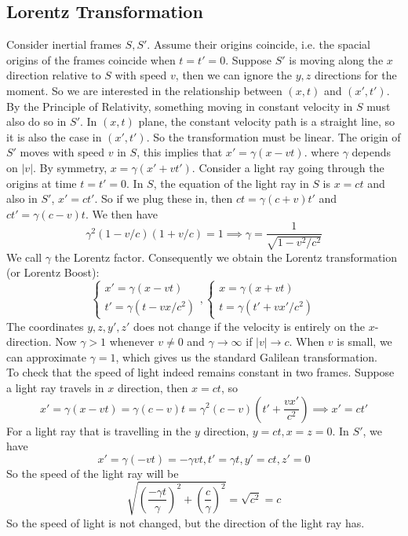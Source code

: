 \subsection{Lorentz Transformation}
Consider inertial frames $S,S'$.
Assume their origins coincide, i.e. the spacial origins of the frames coincide when $t=t'=0$.
Suppose $S'$ is moving along the $x$ direction relative to $S$ with speed $v$, then we can ignore the $y,z$ directions for the moment.
So we are interested in the relationship between $(x,t)$ and $(x',t')$.
By the Principle of Relativity, something moving in constant velocity in $S$ must also do so in $S'$.
In $(x,t)$ plane, the constant velocity path is a straight line, so it is also the case in $(x',t')$.
So the transformation must be linear.
The origin of $S'$ moves with speed $v$ in $S$, this implies that $x'=\gamma(x-vt)$.
where $\gamma$ depends on $|v|$.
By symmetry, $x=\gamma(x'+vt')$.
Consider a light ray going through the origins at time $t=t'=0$.
In $S$, the equation of the light ray in $S$ is $x=ct$ and also in $S'$, $x'=ct'$.
So if we plug these in, then $ct=\gamma(c+v)t'$ and $ct'=\gamma(c-v)t$.
We then have
$$\gamma^2(1-v/c)(1+v/c)=1\implies \gamma=\frac{1}{\sqrt{1-v^2/c^2}}$$
We call $\gamma$ the Lorentz factor.
Consequently we obtain the Lorentz transformation (or Lorentz Boost):
$$\begin{cases}
    x'=\gamma(x-vt)\\
    t'=\gamma(t-vx/c^2)
\end{cases},\begin{cases}
    x=\gamma(x+vt)\\
    t=\gamma(t'+vx'/c^2)
\end{cases}$$
The coordinates $y,z,y',z'$ does not change if the velocity is entirely on the $x$-direction.
Now $\gamma>1$ whenever $v\neq 0$ and $\gamma\to\infty$ if $|v|\to c$.
When $v$ is small, we can approximate $\gamma=1$, which gives us the standard Galilean transformation.\\
To check that the speed of light indeed remains constant in two frames.
Suppose a light ray travels in $x$ direction, then $x=ct$, so
$$x'=\gamma(x-vt)=\gamma(c-v)t=\gamma^2(c-v)\left( t'+\frac{vx'}{c^2} \right)\implies x'=ct'$$
For a light ray that is travelling in the $y$ direction, $y=ct,x=z=0$.
In $S'$, we have
$$x'=\gamma(-vt)=-\gamma vt,t'=\gamma t,y'=ct,z'=0$$
So the speed of the light ray will be
$$\sqrt{\left( \frac{-\gamma t}{\gamma} \right)^2+\left( \frac{c}{\gamma} \right)^2}=\sqrt{c^2}=c$$
So the speed of light is not changed, but the direction of the light ray has.\\
